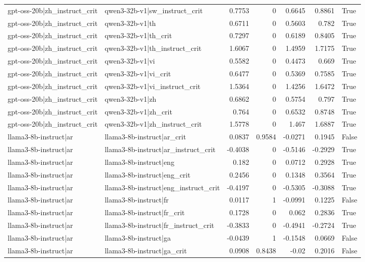 \begin{table}
\begin{tabular}{l l r r r r l}
gpt-oss-20b|zh_instruct_crit & qwen3-32b-v1|sw_instruct_crit & 0.7753 & 0 & 0.6645 & 0.8861 & True \\
gpt-oss-20b|zh_instruct_crit & qwen3-32b-v1|th & 0.6711 & 0 & 0.5603 & 0.782 & True \\
gpt-oss-20b|zh_instruct_crit & qwen3-32b-v1|th_crit & 0.7297 & 0 & 0.6189 & 0.8405 & True \\
gpt-oss-20b|zh_instruct_crit & qwen3-32b-v1|th_instruct_crit & 1.6067 & 0 & 1.4959 & 1.7175 & True \\
gpt-oss-20b|zh_instruct_crit & qwen3-32b-v1|vi & 0.5582 & 0 & 0.4473 & 0.669 & True \\
gpt-oss-20b|zh_instruct_crit & qwen3-32b-v1|vi_crit & 0.6477 & 0 & 0.5369 & 0.7585 & True \\
gpt-oss-20b|zh_instruct_crit & qwen3-32b-v1|vi_instruct_crit & 1.5364 & 0 & 1.4256 & 1.6472 & True \\
gpt-oss-20b|zh_instruct_crit & qwen3-32b-v1|zh & 0.6862 & 0 & 0.5754 & 0.797 & True \\
gpt-oss-20b|zh_instruct_crit & qwen3-32b-v1|zh_crit & 0.764 & 0 & 0.6532 & 0.8748 & True \\
gpt-oss-20b|zh_instruct_crit & qwen3-32b-v1|zh_instruct_crit & 1.5778 & 0 & 1.467 & 1.6887 & True \\
llama3-8b-instruct|ar & llama3-8b-instruct|ar_crit & 0.0837 & 0.9584 & -0.0271 & 0.1945 & False \\
llama3-8b-instruct|ar & llama3-8b-instruct|ar_instruct_crit & -0.4038 & 0 & -0.5146 & -0.2929 & True \\
llama3-8b-instruct|ar & llama3-8b-instruct|eng & 0.182 & 0 & 0.0712 & 0.2928 & True \\
llama3-8b-instruct|ar & llama3-8b-instruct|eng_crit & 0.2456 & 0 & 0.1348 & 0.3564 & True \\
llama3-8b-instruct|ar & llama3-8b-instruct|eng_instruct_crit & -0.4197 & 0 & -0.5305 & -0.3088 & True \\
llama3-8b-instruct|ar & llama3-8b-instruct|fr & 0.0117 & 1 & -0.0991 & 0.1225 & False \\
llama3-8b-instruct|ar & llama3-8b-instruct|fr_crit & 0.1728 & 0 & 0.062 & 0.2836 & True \\
llama3-8b-instruct|ar & llama3-8b-instruct|fr_instruct_crit & -0.3833 & 0 & -0.4941 & -0.2724 & True \\
llama3-8b-instruct|ar & llama3-8b-instruct|ga & -0.0439 & 1 & -0.1548 & 0.0669 & False \\
llama3-8b-instruct|ar & llama3-8b-instruct|ga_crit & 0.0908 & 0.8438 & -0.02 & 0.2016 & False \\

\end{tabular}
\end{table}
